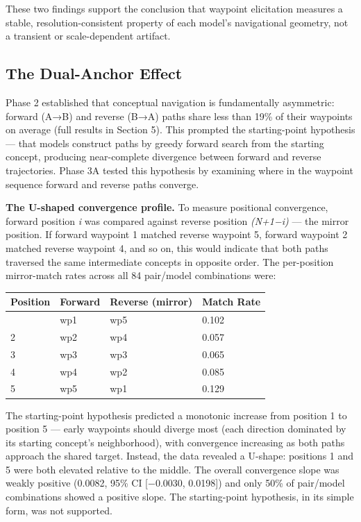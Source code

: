 These two findings support the conclusion that waypoint elicitation measures a stable, resolution-consistent property of each model's navigational geometry, not a transient or scale-dependent artifact.

\subsection{The Dual-Anchor Effect}\label{the-dual-anchor-effect}

Phase 2 established that conceptual navigation is fundamentally asymmetric: forward (A→B) and reverse (B→A) paths share less than 19\% of their waypoints on average (full results in Section 5). This prompted the starting-point hypothesis --- that models construct paths by greedy forward search from the starting concept, producing near-complete divergence between forward and reverse trajectories. Phase 3A tested this hypothesis by examining where in the waypoint sequence forward and reverse paths converge.

\textbf{The U-shaped convergence profile.} To measure positional convergence, forward position \emph{i} was compared against reverse position \emph{(N+1−i)} --- the mirror position. If forward waypoint 1 matched reverse waypoint 5, forward waypoint 2 matched reverse waypoint 4, and so on, this would indicate that both paths traversed the same intermediate concepts in opposite order. The per-position mirror-match rates across all 84 pair/model combinations were:

\begin{longtable}[]{@{}llll@{}}
\toprule\noalign{}
Position & Forward & Reverse (mirror) & Match Rate \\
\midrule\noalign{}
\endhead
\bottomrule\noalign{}
\endlastfoot
1 & wp1 & wp5 & 0.102 \\
2 & wp2 & wp4 & 0.057 \\
3 & wp3 & wp3 & 0.065 \\
4 & wp4 & wp2 & 0.085 \\
5 & wp5 & wp1 & 0.129 \\
\end{longtable}

The starting-point hypothesis predicted a monotonic increase from position 1 to position 5 --- early waypoints should diverge most (each direction dominated by its starting concept's neighborhood), with convergence increasing as both paths approach the shared target. Instead, the data revealed a U-shape: positions 1 and 5 were both elevated relative to the middle. The overall convergence slope was weakly positive (0.0082, 95\% CI {[}−0.0030, 0.0198{]}) and only 50\% of pair/model combinations showed a positive slope. The starting-point hypothesis, in its simple form, was not supported.


